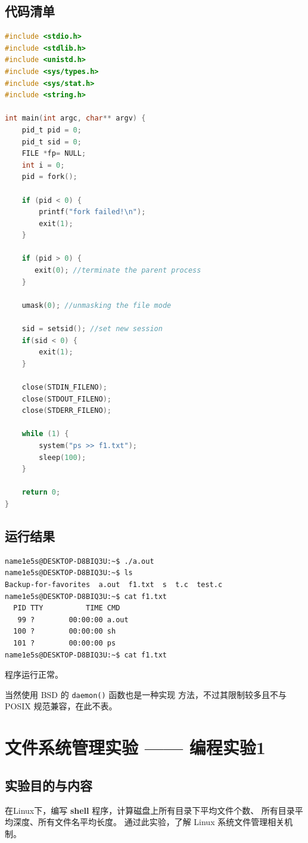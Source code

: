 \documentclass[blue,normal,cn]{elegantnote}
\newcommand{\code}[1]{\colorbox{light-gray}{\texttt{#1}}}
\begin{document}
\subsection{代码清单}
\begin{lstlisting}[language=C]
#include <stdio.h>
#include <stdlib.h>
#include <unistd.h>
#include <sys/types.h>
#include <sys/stat.h>
#include <string.h>

int main(int argc, char** argv) {
    pid_t pid = 0;
    pid_t sid = 0;
    FILE *fp= NULL;
    int i = 0;
    pid = fork();

    if (pid < 0) {
        printf("fork failed!\n");
        exit(1);
    }

    if (pid > 0) {
       exit(0); //terminate the parent process
    }

    umask(0); //unmasking the file mode

    sid = setsid(); //set new session
    if(sid < 0) {
        exit(1);
    }

    close(STDIN_FILENO);
    close(STDOUT_FILENO);
    close(STDERR_FILENO);

    while (1) {
        system("ps >> f1.txt");
        sleep(100);
    }

    return 0;
}
\end{lstlisting}
\subsection{运行结果}
\begin{lstlisting}
name1e5s@DESKTOP-D8BIQ3U:~$ ./a.out
name1e5s@DESKTOP-D8BIQ3U:~$ ls
Backup-for-favorites  a.out  f1.txt  s  t.c  test.c
name1e5s@DESKTOP-D8BIQ3U:~$ cat f1.txt
  PID TTY          TIME CMD
   99 ?        00:00:00 a.out
  100 ?        00:00:00 sh
  101 ?        00:00:00 ps
name1e5s@DESKTOP-D8BIQ3U:~$ cat f1.txt
\end{lstlisting}

程序运行正常。

当然使用 BSD 的 \code{daemon()} 函数也是一种实现
方法，不过其限制较多且不与 POSIX 规范兼容，在此不表。

\section{文件系统管理实验 —— 编程实验1}
\subsection{实验目的与内容}
在Linux下，编写 \textbf{shell} 程序，计算磁盘上所有目录下平均文件个数、
所有目录平均深度、所有文件名平均长度。
通过此实验，了解 Linux 系统文件管理相关机制。
\end{document}
